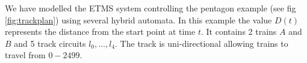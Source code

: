 We have modelled the ETMS system controlling the pentagon example (see fig \ref{fig:trackplan}) using several hybrid automata. In this example the value $D(t)$ represents the distance from the start point at time $t$. 
It contains 2 trains $A$ and $B$ and 5 track circuits $l_0, \ldots , l_4$. The track is uni-directional allowing trains to travel from $0 - 2499$. 


